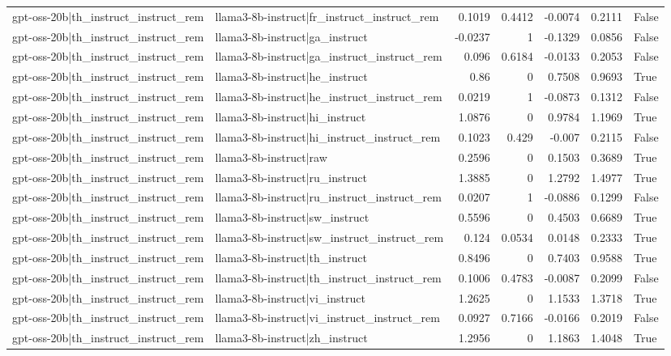 \begin{table}
\begin{tabular}{l l r r r r l}
gpt-oss-20b|th_instruct_instruct_rem & llama3-8b-instruct|fr_instruct_instruct_rem & 0.1019 & 0.4412 & -0.0074 & 0.2111 & False \\
gpt-oss-20b|th_instruct_instruct_rem & llama3-8b-instruct|ga_instruct & -0.0237 & 1 & -0.1329 & 0.0856 & False \\
gpt-oss-20b|th_instruct_instruct_rem & llama3-8b-instruct|ga_instruct_instruct_rem & 0.096 & 0.6184 & -0.0133 & 0.2053 & False \\
gpt-oss-20b|th_instruct_instruct_rem & llama3-8b-instruct|he_instruct & 0.86 & 0 & 0.7508 & 0.9693 & True \\
gpt-oss-20b|th_instruct_instruct_rem & llama3-8b-instruct|he_instruct_instruct_rem & 0.0219 & 1 & -0.0873 & 0.1312 & False \\
gpt-oss-20b|th_instruct_instruct_rem & llama3-8b-instruct|hi_instruct & 1.0876 & 0 & 0.9784 & 1.1969 & True \\
gpt-oss-20b|th_instruct_instruct_rem & llama3-8b-instruct|hi_instruct_instruct_rem & 0.1023 & 0.429 & -0.007 & 0.2115 & False \\
gpt-oss-20b|th_instruct_instruct_rem & llama3-8b-instruct|raw & 0.2596 & 0 & 0.1503 & 0.3689 & True \\
gpt-oss-20b|th_instruct_instruct_rem & llama3-8b-instruct|ru_instruct & 1.3885 & 0 & 1.2792 & 1.4977 & True \\
gpt-oss-20b|th_instruct_instruct_rem & llama3-8b-instruct|ru_instruct_instruct_rem & 0.0207 & 1 & -0.0886 & 0.1299 & False \\
gpt-oss-20b|th_instruct_instruct_rem & llama3-8b-instruct|sw_instruct & 0.5596 & 0 & 0.4503 & 0.6689 & True \\
gpt-oss-20b|th_instruct_instruct_rem & llama3-8b-instruct|sw_instruct_instruct_rem & 0.124 & 0.0534 & 0.0148 & 0.2333 & True \\
gpt-oss-20b|th_instruct_instruct_rem & llama3-8b-instruct|th_instruct & 0.8496 & 0 & 0.7403 & 0.9588 & True \\
gpt-oss-20b|th_instruct_instruct_rem & llama3-8b-instruct|th_instruct_instruct_rem & 0.1006 & 0.4783 & -0.0087 & 0.2099 & False \\
gpt-oss-20b|th_instruct_instruct_rem & llama3-8b-instruct|vi_instruct & 1.2625 & 0 & 1.1533 & 1.3718 & True \\
gpt-oss-20b|th_instruct_instruct_rem & llama3-8b-instruct|vi_instruct_instruct_rem & 0.0927 & 0.7166 & -0.0166 & 0.2019 & False \\
gpt-oss-20b|th_instruct_instruct_rem & llama3-8b-instruct|zh_instruct & 1.2956 & 0 & 1.1863 & 1.4048 & True \\

\end{tabular}
\end{table}
